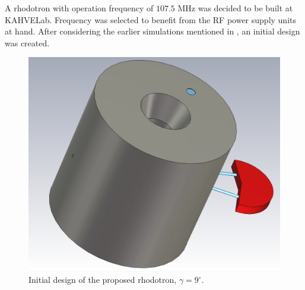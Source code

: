 \documentclass{article}
\begin{document}
A rhodotron with operation frequency of $107.5$ MHz was decided to be built at KAHVELab. 
Frequency was selected to benefit from the RF power supply units at hand.
After considering the earlier simulations mentioned in , an initial design was created.
\begin{figure}[H]
    \centering
    \includegraphics[width=.5\linewidth]{../../../figures/cst/cst_first_design1.png}
    \vspace{20pt}
    \caption{Initial design of the proposed rhodotron, $\gamma=9^\circ$.}
    \label{fig:initial_design}
\end{figure}
\end{document}
